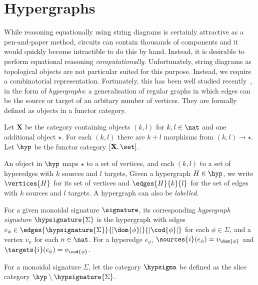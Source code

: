 \section{Hypergraphs}

While reasoning equationally using string diagrams is certainly attractive
as a pen-and-paper method, circuits can contain thousands of components and it
would quickly become intractible to do this by hand.
Instead, it is desirable to perform equational reasoning \emph{computationally}.
Unfortunately, string diagrams as topological objects are not particular suited
for this purpose.
Instead, we require a combinatorial representation.
Fortunately, this has been well studied
recently~\cite{bonchi2022string,bonchi2021string,bonchi2022stringa}, in the
form of \emph{hypergraphs}: a generalisation of regular graphs in which edges
can be the source or target of an arbitary number of vertices.
They are formally defined as objects in a functor category.

\begin{definition}[Hypergraph]
    Let \(\mathbf{X}\) be the category containing objects \((k, l)\) for
    \(k, l \in \nat\) and one additional object \(\star\).
    For each \((k, l)\) there are \(k + l\) morphisms from \((k, l) \to \star\).
    Let \(\hyp\) be the functor category \([\mathbf{X},\set]\).
\end{definition}

An object in \(\hyp\) maps \(\star\) to a set of vertices, and each \((k,l)\) to
a set of hyperedges with \(k\) sources and \(l\) targets,
Given a hypergraph \(H \in \hyp\), we write \(\vertices{H}\) for its set of
vertices and \(\edges{H}{k}{l}\) for the set of edges with \(k\) sources and
\(l\) targets.
A hypergraph can also be \emph{labelled}.

\begin{definition}
    For a given monoidal signature \(\signature\), its corresponding
    \emph{hypergraph signature} \(\hypsignature{\Sigma}\) is the hypergraph with
    edges \(
        e_\phi \in \edges{\hypsignature{\Sigma}}{|\dom{\phi}|}{|\cod{\phi}|}
    \) for each \(\phi \in \Sigma\), and a vertex \(v_n\) for each
    \(n \in \nat\).
    For a hyperedge \(e_\phi\), \(
        \sources{i}(e_\phi) = v_{\dom{\phi}}
    \) and \(
        \targets{i}(e_\phi) = v_{\cod{\phi}}
    \).
\end{definition}

\begin{definition}
    For a monoidal signature \(\Sigma\), let the category \(\hypsigma\) be
    defined as the slice category \(\hyp \setminus \hypsignature{\Sigma}\).
\end{definition}


